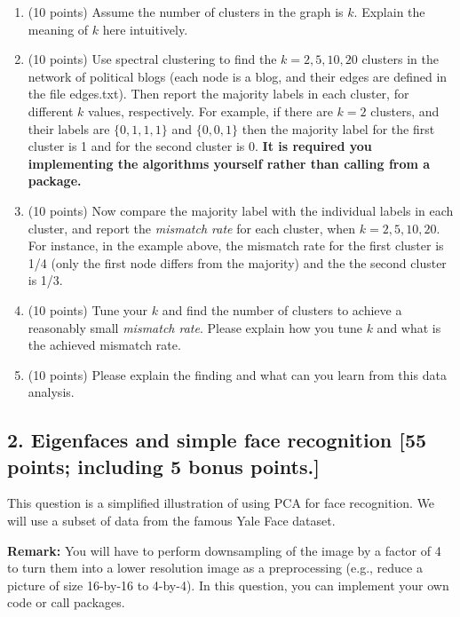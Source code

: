 \documentclass[twoside,10pt]{article}
\begin{document}
\begin{enumerate}
\item (10 points)  Assume the number of clusters in the graph is $k$. Explain the meaning of $k$ here intuitively. 

\item (10 points) Use spectral clustering to find the $k = 2, 5, 10, 20$ clusters in the network of political blogs (each node is a blog, and their edges are defined in the file \textsf{edges.txt}). Then report the majority labels in each cluster, for different $k$ values, respectively. For example, if there are $k = 2$ clusters, and their labels are $\{0, 1, 1, 1\}$ and $\{0, 0, 1\}$ then the majority label for the first cluster is 1 and for the second cluster is 0. {\bf It is required you implementing the algorithms yourself rather than calling from a package.} 

\item (10 points) Now compare the majority label with the individual labels in each cluster, and report the {\it mismatch rate} for each cluster, when $k = 2, 5, 10, 20$. For instance, in the example above, the mismatch rate for the first cluster is 1/4 (only the first node differs from the majority) and the the second cluster is 1/3. 

\item (10 points) Tune your $k$ and find the number of clusters to achieve a reasonably small {\it mismatch rate}. Please explain how you tune $k$ and what is the achieved mismatch rate.  

\item (10 points) Please explain the finding and what can you learn from this data analysis.


\end{enumerate}

\clearpage


\subsection*{2. Eigenfaces and simple face recognition [55 points; including 5 bonus points.]}

This question is a simplified illustration of using PCA for face recognition. We will use a subset of data from the famous Yale Face dataset. 

{\bf Remark:} You will have to perform downsampling of the image by a factor of 4 to turn them into a lower resolution image as a preprocessing (e.g., reduce a picture of size 16-by-16 to 4-by-4). In this question, you can implement your own code or call packages. 
\end{document}
